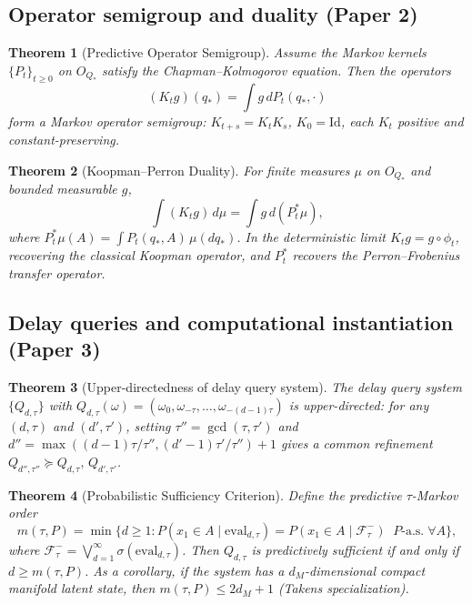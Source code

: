 \documentclass[11pt]{article}
\newtheorem{theorem}{Theorem}
\begin{document}
\subsection{Operator semigroup and duality \textnormal{(Paper 2)}}

\begin{theorem}[Predictive Operator Semigroup]
Assume the Markov kernels $\{P_t\}_{t\ge0}$ on $O_{Q_*}$ satisfy the
Chapman--Kolmogorov equation.  Then the operators
\[
(K_t g)(q_*) = \int g\,dP_t(q_*,\cdot)
\]
form a Markov operator semigroup: $K_{t+s} = K_t K_s$, $K_0 =
\mathrm{Id}$, each $K_t$ positive and constant-preserving.
\end{theorem}

\begin{theorem}[Koopman--Perron Duality]
For finite measures $\mu$ on $O_{Q_*}$ and bounded measurable $g$,
\[
\int (K_t g)\,d\mu = \int g\,d(P_t^*\mu),
\]
where $P_t^*\mu(A)=\int P_t(q_*,A)\,\mu(dq_*)$.  In the deterministic
limit $K_t g = g\circ\phi_t$, recovering the classical Koopman
operator, and $P_t^*$ recovers the Perron--Frobenius transfer operator.
\end{theorem}

\subsection{Delay queries and computational instantiation \textnormal{(Paper 3)}}

\begin{theorem}[Upper-directedness of delay query system]
The delay query system $\{Q_{d,\tau}\}$ with $Q_{d,\tau}(\omega) =
(\omega_0,\omega_{-\tau},\ldots,\omega_{-(d-1)\tau})$ is upper-directed:
for any $(d,\tau)$ and $(d',\tau')$, setting $\tau'' = \gcd(\tau,\tau')$
and $d'' = \max((d-1)\tau/\tau'',(d'-1)\tau'/\tau'')+1$ gives a common
refinement $Q_{d'',\tau''} \succeq Q_{d,\tau},\, Q_{d',\tau'}$.
\end{theorem}

\begin{theorem}[Probabilistic Sufficiency Criterion]
Define the predictive $\tau$-Markov order
\[
m(\tau,P) = \min\{d\ge1 : P(x_1\in A\mid \mathrm{eval}_{d,\tau})
= P(x_1\in A\mid\mathcal F_\tau^-)\;\; P\text{-a.s.}\;\forall A\},
\]
where $\mathcal F_\tau^- = \bigvee_{d=1}^\infty \sigma(\mathrm{eval}_{d,\tau})$.
Then $Q_{d,\tau}$ is predictively sufficient if and only if $d\ge m(\tau,P)$.
As a corollary, if the system has a $d_M$-dimensional compact manifold
latent state, then $m(\tau,P)\le 2d_M+1$ (Takens specialization).
\end{theorem}
\end{document}

